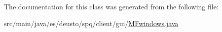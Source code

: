The documentation for this class was generated from the following file\+:\begin{DoxyCompactItemize}
\item 
src/main/java/es/deusto/spq/client/gui/\hyperlink{_m_fwindows_8java}{M\+Fwindows.\+java}\end{DoxyCompactItemize}
